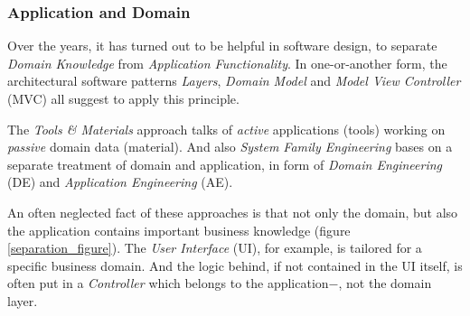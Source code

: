 %
%
%
%
%
%
%

\subsubsection{Application and Domain}
\label{application_and_domain_heading}

Over the years, it has turned out to be helpful in software design, to separate
\emph{Domain Knowledge} from \emph{Application Functionality}. In
one-or-another form, the architectural software patterns \cite{heller2005}
\emph{Layers}, \emph{Domain Model} and \emph{Model View Controller} (MVC) all
suggest to apply this principle.

The \emph{Tools \& Materials} approach \cite{tandm} talks of \emph{active}
applications (tools) working on \emph{passive} domain data (material). And also
\emph{System Family Engineering} \cite{domainengg} bases on a separate
treatment of domain and application, in form of \emph{Domain Engineering} (DE)
and \emph{Application Engineering} (AE).

An often neglected fact of these approaches is that not only the domain, but
also the application contains important business knowledge (figure
\ref{separation_figure}). The \emph{User Interface} (UI), for example, is
tailored for a specific business domain. And the logic behind, if not
contained in the UI itself, is often put in a \emph{Controller} which belongs
to the application$-$, not the domain layer.

